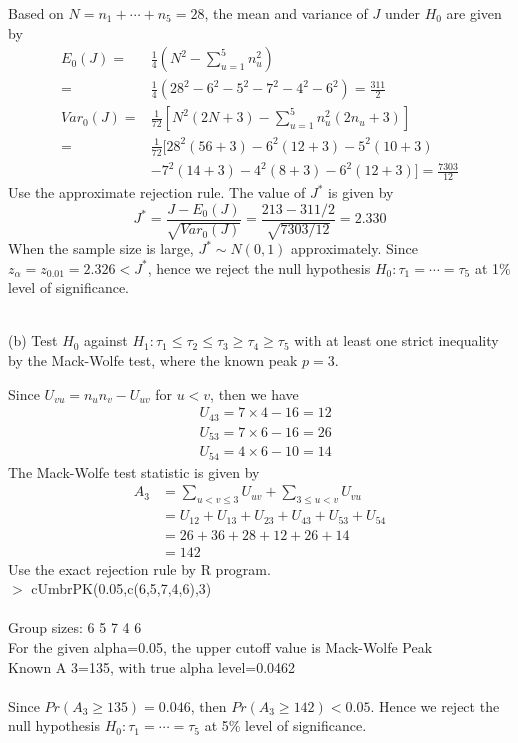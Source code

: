\documentclass[12pt,a4paper]{article}
\begin{document}
Based on $N=n_{1}+\cdots+n_{5}=28$, the mean and variance of $J$ under $H_{0}$ are given by
\begin{align*}
E_{0}(J)=&\frac{1}{4}\left(N^{2}-\sum_{u=1}^{5}n_{u}^{2}\right)\\
=&\frac{1}{4}\left(28^{2}-6^{2}-5^{2}-7^{2}-4^{2}-6^{2}\right)=\frac{311}{2}\\
Var_{0}(J)=&\frac{1}{72}\left[N^{2}(2N+3)-\sum_{u=1}^{5}n_{u}^{2}(2n_{u}+3)\right]\\
=&\frac{1}{72}[28^{2}(56+3)-6^{2}(12+3)-5^{2}(10+3)\\
&-7^{2}(14+3)-4^{2}(8+3)-6^{2}(12+3)]=\frac{7303}{12}
\end{align*}
Use the approximate rejection rule. The value of $J^{*}$ is given by
$$J^{*}=\frac{J-E_{0}(J)}{\sqrt{Var_{0}(J)}}=\frac{213-311/2}{\sqrt{7303/12}}=2.330$$
When the sample size is large, $J^{*}\sim N(0,1)$ approximately. Since $z_{\alpha}=z_{0.01}=2.326<J^{*}$, hence we reject the null hypothesis $H_{0}:\tau_{1}=\cdots=\tau_{5}$ at 1\% level of significance.

~\\
(b) Test $H_{0}$ against $H_{1}:\tau_{1}\leqslant\tau_{2}\leqslant\tau_{3}\geqslant\tau_{4}\geqslant\tau_{5}$ with at least one strict inequality by the Mack-Wolfe test, where the known peak $p=3$.

Since $U_{vu}=n_{u}n_{v}-U_{uv}$ for $u<v$, then we have
\begin{align*}
&U_{43}=7\times 4-16=12\\
&U_{53}=7\times 6-16=26\\
&U_{54}=4\times 6-10=14
\end{align*}
The Mack-Wolfe test statistic is given by
\begin{align*}
A_{3}&=\sum_{u<v\leqslant 3}U_{uv}+\sum_{3\leqslant u<v}U_{vu}\\
&=U_{12}+U_{13}+U_{23}+U_{43}+U_{53}+U_{54}\\
&=26+36+28+12+26+14\\
&=142
\end{align*}
Use the exact rejection rule by R program.\\

\indent $>$ cUmbrPK(0.05,c(6,5,7,4,6),3)\\
~\\
\indent Group sizes: 6 5 7 4 6\\
\indent For the given alpha=0.05, the upper cutoff value is Mack-Wolfe Peak\\
\indent Known A 3=135, with true alpha level=0.0462\\
~\\
Since $Pr(A_{3}\geqslant 135)=0.046$, then $Pr(A_{3}\geqslant 142)<0.05$. Hence we reject the null hypothesis $H_{0}:\tau_{1}=\cdots=\tau_{5}$ at 5\% level of significance.
\end{document}
